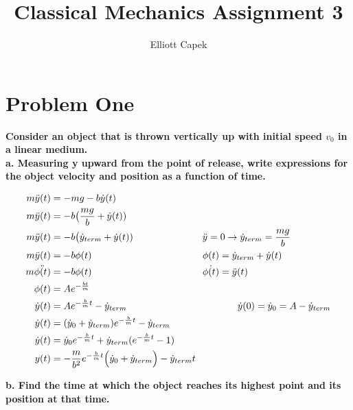 \documentclass[10pt]{article} %
\title{Classical Mechanics Assignment 3}
\author{Elliott Capek}
\begin{document}
\maketitle{}

\section{Problem One}
\textbf{Consider an object that is thrown vertically up with initial speed $v_0$ in a linear medium.} \\

\textbf{a. Measuring y upward from the point of release, write expressions for the object velocity and position as a function of time.}

\begin{align*}
  m\ddot{y}(t) &= -mg - b\dot{y}(t)\\
  m\ddot{y}(t) &= -b\big(\frac{mg}{b} + \dot{y}(t))\\
  m\ddot{y}(t) &= -b\big(\dot{y}_{term} + \dot{y}(t))
  \hspace{1in}\ddot{y} = 0 \rightarrow \dot{y}_{term} = \frac{mg}{b}\\
  m\ddot{y}(t) &= -b\phi(t)
  \hspace{1.6in} \phi(t) = \dot{y}_{term} + \dot{y}(t)\\
  m\ddot{\phi(t)} &= -b\phi(t)
  \hspace{1.6in} \dot{\phi(t)} = \ddot{y}(t)\\
  \phi(t) &= Ae^{-\frac{bt}{m}}\\
  \dot{y}(t) &= Ae^{-\frac{b}{m}t} - \dot{y}_{term}
  \hspace{1.6in} \dot{y}(0) = \dot{y}_0 = A - \dot{y}_{term}\\
  \dot{y}(t) &= (\dot{y}_0 + \dot{y}_{term})e^{-\frac{b}{m}t} - \dot{y}_{term}\\
  \dot{y}(t) &= \dot{y}_0e^{-\frac{b}{m}t} + \dot{y}_{term}(e^{-\frac{b}{m}t} - 1)\\
  y(t) &= -\frac{m}{b^2}e^{-\frac{b}{m}t}\Big(\dot{y}_0 + \dot{y}_{term} \Big) - \dot{y}_{term}t\\
\end{align*}

\textbf{b. Find the time at which the object reaches its highest point and its position at that time.}
\end{document}

